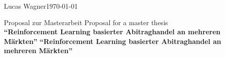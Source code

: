 \documentclass[a4paper, 11pt]{article}
\newcommand{\Titel}{Reinforcement Learning basierter Abitraghandel an mehreren Märkten} %
\newcommand{\Author}{Lucas Wagner} %
\begin{document}
\Author \hfill \today\\
\newline
%
\begin{center}
		{\large{Proposal zur Masterarbeit}}
		{\large{Proposal for a master thesis}} \\
  	\vspace*{0.5cm}
  		{\Large{\bf "`\Titel{}"'}}
  		{\Large{\bf ``\Titel{}''}}
\end{center}
%
\setlength{\parskip}{1.5ex plus0.5ex minus 0.5ex}

\end{document}

